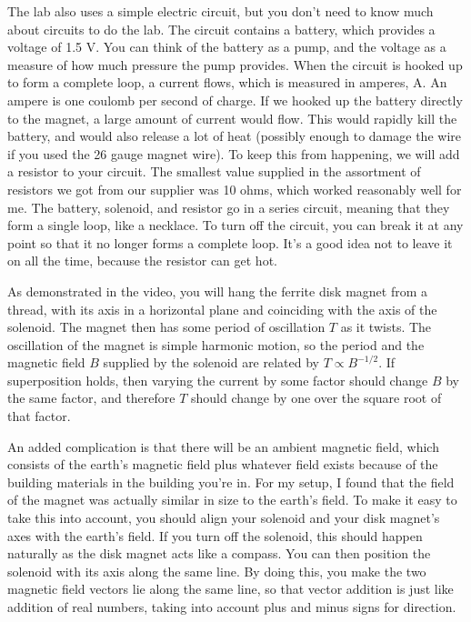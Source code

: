 The lab also uses a simple electric circuit, but you don't need to know much about circuits to do the lab.
The circuit contains a battery, which provides a voltage of 1.5 V. You can think of the battery as a pump, and the
voltage as a measure of how much pressure the pump provides. When the circuit is hooked up to form a complete loop,
a current flows, which is measured in amperes, A. An ampere is one coulomb per second of charge. If we hooked up
the battery directly to the magnet, a large amount of current would flow. This would rapidly kill the battery, and
would also release a lot of heat (possibly enough to damage the wire if you used the 26 gauge magnet wire).
To keep this from happening, we will add a resistor to your circuit. The smallest
value supplied in the assortment of resistors we got from our supplier was 10 ohms, which worked reasonably well for me.
The battery, solenoid, and resistor go in a series circuit, meaning that they form a single loop, like a necklace.
To turn off the circuit, you can break it at any point so that it no longer forms a complete loop. It's a good idea
not to leave it on all the time, because the resistor can get hot.

As demonstrated in the video, you will hang the ferrite disk magnet from a thread, with its axis in a horizontal plane
and coinciding with the axis of the solenoid. The magnet then has some period of oscillation $T$ as it twists.
The oscillation of the magnet is simple harmonic motion, so the period and
the magnetic field $B$ supplied by the solenoid are related by $T\propto B^{-1/2}$.
If superposition holds, then varying the current by some factor should change $B$ by the same factor, and therefore
$T$ should change by one over the square root of that factor.

An added complication is that there will be an ambient magnetic field, which consists of the earth's magnetic field
plus whatever field exists because of the building materials in the building you're in. For my setup, I found that
the field of the magnet was actually similar in size to the earth's field. To make it easy to take this into account,
you should align your solenoid and your disk magnet's axes with the earth's field. If you turn off the solenoid, this should
happen naturally as the disk magnet acts like a compass. You can then position the solenoid with its axis along the same line.
By doing this, you make the two magnetic field vectors lie along the same line, so that vector addition is just like addition of
real numbers, taking into account plus and minus signs for direction.


